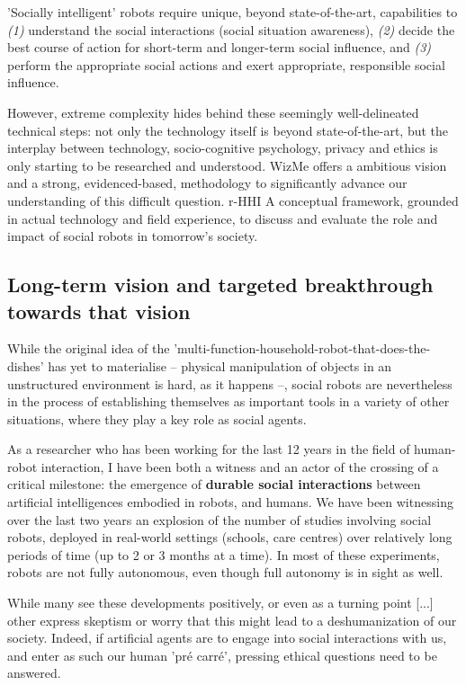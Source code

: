 \documentclass[]{article}
\newcommand{\project}{WizMe\xspace}
\begin{document}
'Socially intelligent' robots require unique, beyond state-of-the-art,
capabilities to \emph{(1)} understand the social interactions (social
situation awareness), \emph{(2)} decide the best course of action for
short-term and longer-term social influence, and \emph{(3)} perform the
appropriate social actions and exert appropriate, responsible social influence.

However, extreme complexity hides behind these seemingly well-delineated
technical steps: not only the technology itself is beyond state-of-the-art, but
the interplay between technology, socio-cognitive psychology, privacy and ethics
is only starting to be researched and understood. \project offers a ambitious
vision and a strong, evidenced-based, methodology to significantly advance our
understanding of this difficult question. r-HHI A conceptual framework, grounded in
actual technology and field experience, to discuss and evaluate the role and
impact of social robots in tomorrow's society.




\subsection{Long-term vision and targeted breakthrough towards that vision}

While the original idea of the
'multi-function-household-robot-that-does-the-dishes' has yet to materialise --
physical manipulation of objects in an unstructured environment is hard, as it
happens --, social robots are nevertheless in the process of establishing
themselves as important tools in a variety of other situations, where they play
a key role as social agents.

As a researcher who has been working for the last 12 years in the field of
human-robot interaction, I have been both a witness and an actor of the crossing
of a critical milestone: the emergence of \textbf{durable social interactions}
between artificial intelligences embodied in robots, and humans. We have been
witnessing over the last two years an explosion of the number of studies
involving social robots, deployed in real-world settings (schools, care centres)
over relatively long periods of time (up to 2 or 3 months at a time). In most of
these experiments, robots are not fully autonomous, even though full autonomy is
in sight as well.

While many see these developments positively, or even as a turning point [...]
other express skeptism or worry that this might lead to a deshumanization of our
society. Indeed, if artificial agents are to engage into social interactions
with us, and enter as such our human 'pré carré', pressing ethical questions
need to be answered.
\end{document}
